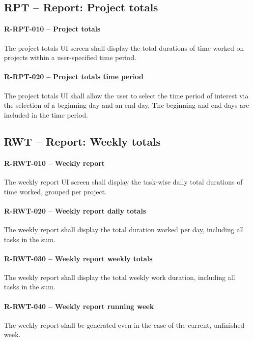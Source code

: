 \subsection{RPT -- Report: Project totals}
\paragraph{R-RPT-010 -- Project totals}
The project totals UI screen shall display the total durations of time
worked on projects within a user-specified time period.

\paragraph{R-RPT-020 -- Project totals time period}
The project totals UI shall allow the user to select the time period
of interest via the selection of a beginning day and an end day. The
beginning and end days are included in the time period.

\subsection{RWT -- Report: Weekly totals}
\paragraph{R-RWT-010 -- Weekly report}
The weekly report UI screen shall display the task-wise daily total
durations of time worked, grouped per project.

\paragraph{R-RWT-020 -- Weekly report daily totals}
The weekly report shall display the total duration worked per day, including
all tasks in the sum.

\paragraph{R-RWT-030 -- Weekly report weekly totals}
The weekly report shall display the total weekly work duration, including
all tasks in the sum.

\paragraph{R-RWT-040 -- Weekly report running week}
The weekly report shall be generated even in the case of the current, unfinished
week.

